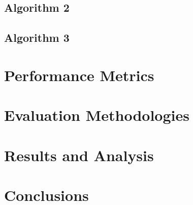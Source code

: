 \documentclass[a4paper]{article}
\begin{document}
\subsection{Algorithm 2}

\subsection{Algorithm 3}

\section{Performance Metrics}

\section{Evaluation Methodologies}

\section{Results and Analysis}

\section{Conclusions}
\end{document}
